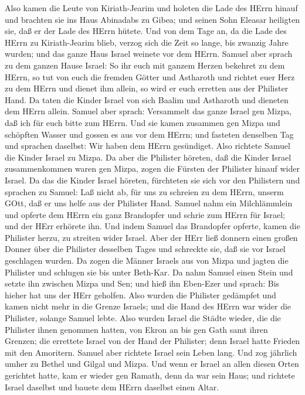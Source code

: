  Also kamen die Leute von Kiriath-Jearim und holeten die
Lade des HErrn hinauf und brachten sie ins Haus Abinadabs zu Gibea; und
seinen Sohn Eleasar heiligten sie, daß er der Lade des HErrn hütete.
 Und von dem Tage an, da die Lade des HErrn zu
Kiriath-Jearim blieb, verzog sich die Zeit so lange, bis zwanzig Jahre
wurden; und das ganze Haus Israel weinete vor dem HErrn. 
Samuel aber sprach zu dem ganzen Hause Israel: So ihr euch mit ganzem
Herzen bekehret zu dem HErrn, so tut von euch die fremden Götter und
Astharoth und richtet euer Herz zu dem HErrn und dienet ihm allein, so
wird er euch erretten aus der Philister Hand.  Da taten die
Kinder Israel von sich Baalim und Astharoth und dieneten dem HErrn
allein.  Samuel aber sprach: Versammelt das ganze Israel gen
Mizpa, daß ich für euch bitte zum HErrn.  Und sie kamen
zusammen gen Mizpa und schöpften Wasser und gossen es aus vor dem HErrn;
und fasteten denselben Tag und sprachen daselbst: Wir haben dem HErrn
gesündiget. Also richtete Samuel die Kinder Israel zu Mizpa.
 Da aber die Philister höreten, daß die Kinder Israel
zusammenkommen waren gen Mizpa, zogen die Fürsten der Philister hinauf
wider Israel. Da das die Kinder Israel höreten, fürchteten sie sich vor
den Philistern  und sprachen zu Samuel: Laß nicht ab, für
uns zu schreien zu dem HErrn, unserm GOtt, daß er uns helfe aus der
Philister Hand.  Samuel nahm ein Milchlämmlein und opferte
dem HErrn ein ganz Brandopfer und schrie zum HErrn für Israel; und der
HErr erhörete ihn.  Und indem Samuel das Brandopfer
opferte, kamen die Philister herzu, zu streiten wider Israel. Aber der
HErr ließ donnern einen großen Donner über die Philister desselben Tages
und schreckte sie, daß sie vor Israel geschlagen wurden. 
Da zogen die Männer Israels aus von Mizpa und jagten die Philister und
schlugen sie bis unter Beth-Kar.  Da nahm Samuel einen
Stein und setzte ihn zwischen Mizpa und Sen; und hieß ihn Eben-Ezer und
sprach: Bis hieher hat uns der HErr geholfen.  Also wurden
die Philister gedämpfet und kamen nicht mehr in die Grenze Israels; und
die Hand des HErrn war wider die Philister, solange Samuel lebte.
 Also wurden Israel die Städte wieder, die die Philister
ihnen genommen hatten, von Ekron an bis gen Gath samt ihren Grenzen; die
errettete Israel von der Hand der Philister; denn Israel hatte Frieden
mit den Amoritern.  Samuel aber richtete Israel sein Leben
lang.  Und zog jährlich umher zu Bethel und Gilgal und
Mizpa. Und wenn er Israel an allen diesen Orten gerichtet hatte,
 kam er wieder gen Ramath, denn da war sein Haus; und
richtete Israel daselbst und bauete dem HErrn daselbst einen Altar.

